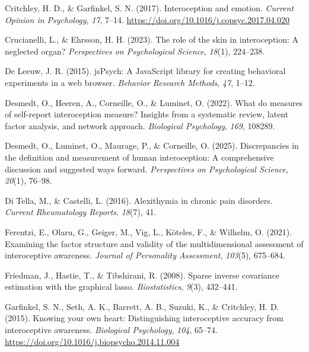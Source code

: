 \documentclass[
  jou,
  floatsintext,
  longtable,
  nolmodern,
  notxfonts,
  notimes,
  colorlinks=true,linkcolor=blue,citecolor=blue,urlcolor=blue]{apa7}
\newlength{\cslhangindent}
\newenvironment{CSLReferences}[2] %
 {\begin{list}{}{%
  \setlength{\itemindent}{0pt}
  \setlength{\leftmargin}{0pt}
  \setlength{\parsep}{0pt}
  \ifodd #1
   \setlength{\leftmargin}{\cslhangindent}
   \setlength{\itemindent}{-1\cslhangindent}
  \fi
  \setlength{\itemsep}{#2\baselineskip}}}
 {\end{list}}
\begin{document}
\begin{CSLReferences}{1}{0}
Critchley, H. D., \& Garfinkel, S. N. (2017). Interoception and emotion.
\emph{Current Opinion in Psychology}, \emph{17}, 7--14.
\url{https://doi.org/10.1016/j.copsyc.2017.04.020}

Crucianelli, L., \& Ehrsson, H. H. (2023). The role of the skin in
interoception: A neglected organ? \emph{Perspectives on Psychological
Science}, \emph{18}(1), 224--238.

De Leeuw, J. R. (2015). jsPsych: A JavaScript library for creating
behavioral experiments in a web browser. \emph{Behavior Research
Methods}, \emph{47}, 1--12.

Desmedt, O., Heeren, A., Corneille, O., \& Luminet, O. (2022). What do
measures of self-report interoception measure? Insights from a
systematic review, latent factor analysis, and network approach.
\emph{Biological Psychology}, \emph{169}, 108289.

Desmedt, O., Luminet, O., Maurage, P., \& Corneille, O. (2025).
Discrepancies in the definition and measurement of human interoception:
A comprehensive discussion and suggested ways forward.
\emph{Perspectives on Psychological Science}, \emph{20}(1), 76--98.

Di Tella, M., \& Castelli, L. (2016). Alexithymia in chronic pain
disorders. \emph{Current Rheumatology Reports}, \emph{18}(7), 41.

Ferentzi, E., Olaru, G., Geiger, M., Vig, L., Köteles, F., \& Wilhelm,
O. (2021). Examining the factor structure and validity of the
multidimensional assessment of interoceptive awareness. \emph{Journal of
Personality Assessment}, \emph{103}(5), 675--684.

Friedman, J., Hastie, T., \& Tibshirani, R. (2008). Sparse inverse
covariance estimation with the graphical lasso. \emph{Biostatistics},
\emph{9}(3), 432--441.

Garfinkel, S. N., Seth, A. K., Barrett, A. B., Suzuki, K., \& Critchley,
H. D. (2015). Knowing your own heart: Distinguishing interoceptive
accuracy from interoceptive awareness. \emph{Biological Psychology},
\emph{104}, 65--74.
\url{https://doi.org/10.1016/j.biopsycho.2014.11.004}


\end{CSLReferences}
\end{document}
